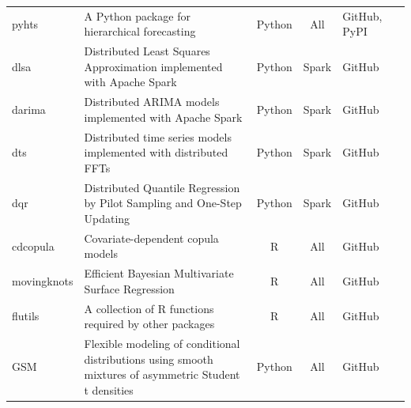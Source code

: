 \documentclass[twoside,a4paper]{article}
\begin{document}
\begin{refsection}
\begin{center}
{\begin{tabular}{lp{6cm}cclp{3cm}}
pyhts         & A Python package for hierarchical forecasting                                                                                           & Python   & All         & GitHub, PyPI & \citet{ZhangB2023OptimalReconciliation}                     \\
dlsa          & Distributed Least Squares Approximation implemented with Apache Spark                                                                   & Python   & Spark       & GitHub       & \citet{ZhuX2021LeastSquareApproximation}                    \\
darima        & Distributed ARIMA models implemented with Apache Spark                                                                                  & Python   & Spark       & GitHub       & \citet{WangX2023DistributedARIMA}                           \\
dts           & Distributed time series models implemented with distributed FFTs                                                                        & Python   & Spark       & GitHub                                                                     \\
dqr           & Distributed Quantile Regression by Pilot Sampling and One-Step Updating                                                                 & Python   & Spark       & GitHub       & \citet{PanR2022NoteDistributed}                             \\
cdcopula      & Covariate-dependent copula models                                                                                                       & R        & All         & GitHub       & \citet{LiF2018ImprovingForecasting}                         \\
movingknots   & Efficient Bayesian Multivariate Surface Regression                                                                                      & R        & All         & GitHub       & \citet{LiF2013EfficientBayesian}                            \\
flutils       & A collection of R functions required by other packages                                                                    & R        & All         & GitHub                                                                     \\
GSM           & Flexible modeling of conditional distributions using smooth mixtures of asymmetric Student t densities                                  & Python   & All         & GitHub       & \citet{LiF2010FlexibleModeling}                             \\
  \bottomrule
\end{tabular}
}
\end{center}

\end{refsection}
\end{document}
